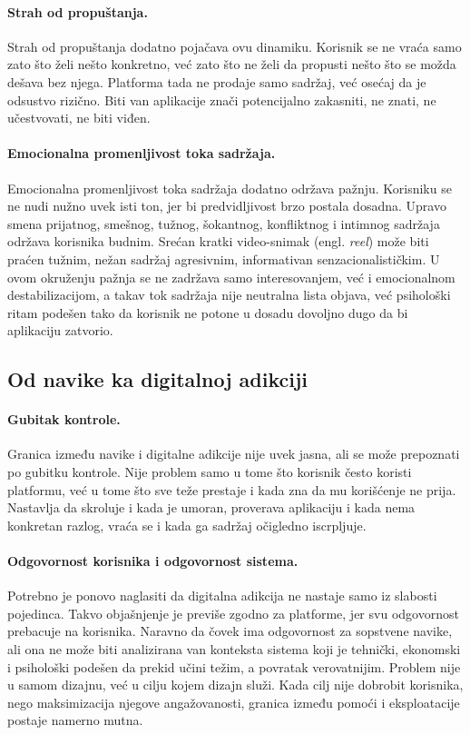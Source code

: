 \paragraph{Strah od propuštanja.}
Strah od propuštanja dodatno pojačava ovu dinamiku. Korisnik se ne vraća samo zato što želi nešto konkretno, već zato što ne želi da propusti nešto što se možda dešava bez njega. Platforma tada ne prodaje samo sadržaj, već osećaj da je odsustvo rizično. Biti van aplikacije znači potencijalno zakasniti, ne znati, ne učestvovati, ne biti viđen.

\paragraph{Emocionalna promenljivost toka sadržaja.}
Emocionalna promenljivost toka sadržaja dodatno održava pažnju. Korisniku se ne nudi nužno uvek isti ton, jer bi predvidljivost brzo postala dosadna. Upravo smena prijatnog, smešnog, tužnog, šokantnog, konfliktnog i intimnog sadržaja održava korisnika budnim. Srećan kratki video-snimak (engl. \textit{reel}) može biti praćen tužnim, nežan sadržaj agresivnim, informativan senzacionalističkim. U ovom okruženju pažnja se ne zadržava samo interesovanjem, već i emocionalnom destabilizacijom, a takav tok sadržaja nije neutralna lista objava, već psihološki ritam podešen tako da korisnik ne potone u dosadu dovoljno dugo da bi aplikaciju zatvorio.

\subsection{Od navike ka digitalnoj adikciji}

\paragraph{Gubitak kontrole.}
Granica između navike i digitalne adikcije nije uvek jasna, ali se može prepoznati po gubitku kontrole. Nije problem samo u tome što korisnik često koristi platformu, već u tome što sve teže prestaje i kada zna da mu korišćenje ne prija. Nastavlja da skroluje i kada je umoran, proverava aplikaciju i kada nema konkretan razlog, vraća se i kada ga sadržaj očigledno iscrpljuje.

\paragraph{Odgovornost korisnika i odgovornost sistema.}
Potrebno je ponovo naglasiti da digitalna adikcija ne nastaje samo iz slabosti pojedinca. Takvo objašnjenje je previše zgodno za platforme, jer svu odgovornost prebacuje na korisnika. Naravno da čovek ima odgovornost za sopstvene navike, ali ona ne može biti analizirana van konteksta sistema koji je tehnički, ekonomski i psihološki podešen da prekid učini težim, a povratak verovatnijim. Problem nije u samom dizajnu, već u cilju kojem dizajn služi. Kada cilj nije dobrobit korisnika, nego maksimizacija njegove angažovanosti, granica između pomoći i eksploatacije postaje namerno mutna.


